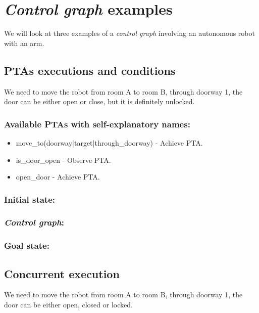 \chapter{\textit{Control graph} examples}
We will look at three examples of a \textit{control graph} involving an autonomous robot with an arm. \\
\section{PTAs executions and conditions}
We need to move the robot from room A to room B, through doorway 1, the door can be either open or close, but it is definitely unlocked. \\
\subsection{Available PTAs with self-explanatory names:}
\begin{itemize}
\item move_to(doorway|target|through_doorway) - Achieve PTA.
\item is_door_open - Observe PTA.
\item open_door - Achieve PTA.
\end{itemize}
\subsection{Initial state: }
 \clearpage
\subsection{\textit{Control graph}: }
 \subsection{Goal state: }
 \section{Concurrent execution \label{example_concurrent_execution}}
We need to move the robot from room A to room B, through doorway 1, the door can be either open, closed or locked. \\
